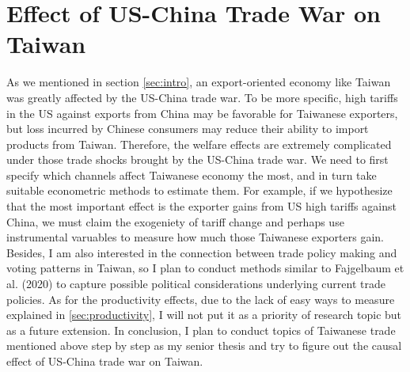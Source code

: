 \documentclass[12pt]{article}
\begin{document}
\section{Effect of US-China Trade War on Taiwan}
\label{sec:Taiwan}
As we mentioned in section \ref{sec:intro}, an export-oriented economy like Taiwan was greatly affected by the US-China trade war.
To be more specific, high tariffs in the US against exports from China may be favorable for Taiwanese exporters, 
but loss incurred by Chinese consumers may reduce their ability to import products from Taiwan.
Therefore, the welfare effects are extremely complicated under those trade shocks brought by the US-China trade war.
We need to first specify which channels affect Taiwanese economy the most, and in turn take suitable econometric methods to estimate them.
For example, if we hypothesize that the most important effect is the exporter gains from US high tariffs against China, 
we must claim the exogeniety of tariff change and perhaps use instrumental varuables to measure how much those Taiwanese exporters gain. 
Besides, I am also interested in the connection between trade policy making and voting patterns in Taiwan, 
so I plan to conduct methods similar to Fajgelbaum et al. (2020) \cite{fajgelbaum2020return} to capture possible political considerations underlying current trade policies.
As for the productivity effects, due to the lack of easy ways to measure explained in \ref{sec:productivity}, I will not put it as a priority of research topic but as a future extension. 
In conclusion, I plan to conduct topics of Taiwanese trade mentioned above step by step as my senior thesis and try to figure out the causal effect of US-China trade war on Taiwan.



\end{document}
